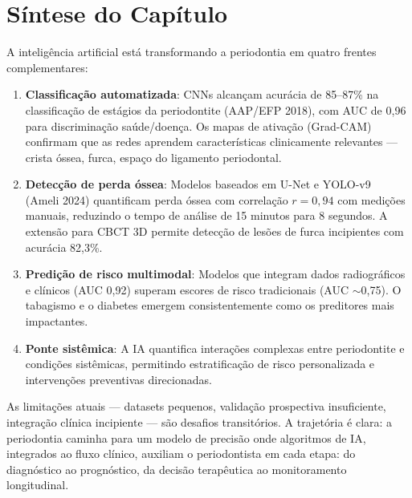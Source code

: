 

\section{Síntese do Capítulo}

A inteligência artificial está transformando a periodontia em quatro frentes complementares:

\begin{enumerate}
    \item \textbf{Classificação automatizada}: CNNs alcançam acurácia de 85--87\% na classificação de estágios da periodontite (AAP/EFP 2018), com AUC de 0,96 para discriminação saúde/doença. Os mapas de ativação (Grad-CAM) confirmam que as redes aprendem características clinicamente relevantes --- crista óssea, furca, espaço do ligamento periodontal.
    
    \item \textbf{Detecção de perda óssea}: Modelos baseados em U-Net e YOLO-v9~\cite{ameli2024} (Ameli 2024) quantificam perda óssea com correlação $r = 0,94$ com medições manuais, reduzindo o tempo de análise de 15 minutos para 8 segundos. A extensão para CBCT 3D permite detecção de lesões de furca incipientes com acurácia 82,3\%.
    
    \item \textbf{Predição de risco multimodal}: Modelos que integram dados radiográficos e clínicos (AUC 0,92) superam escores de risco tradicionais (AUC $\sim$0,75). O tabagismo e o diabetes emergem consistentemente como os preditores mais impactantes.
    
    \item \textbf{Ponte sistêmica}: A IA quantifica interações complexas entre periodontite e condições sistêmicas, permitindo estratificação de risco personalizada e intervenções preventivas direcionadas.
\end{enumerate}

As limitações atuais --- datasets pequenos, validação prospectiva insuficiente, integração clínica incipiente --- são desafios transitórios. A trajetória é clara: a periodontia caminha para um modelo de precisão onde algoritmos de IA, integrados ao fluxo clínico, auxiliam o periodontista em cada etapa: do diagnóstico ao prognóstico, da decisão terapêutica ao monitoramento longitudinal.

